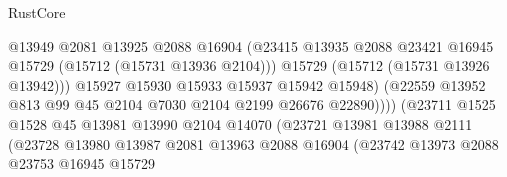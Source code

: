 \begin{lexlean}{RustCore}
\begin{coremodule}
                                          @13949
                                          @2081
                                          @13925
                                          @2088
                                          @16904
                                          (@23415
                                            @13935
                                            @2088
                                            @23421
                                            @16945
                                            @15729
                                            (@15712 (@15731 @13936 @2104)))
                                          @15729
                                          (@15712 (@15731 @13926 @13942)))
                                        @15927
                                        @15930
                                        @15933
                                        @15937
                                        @15942
                                        @15948)
                                      (@22559
                                        @13952
                                        @813
                                        @99
                                        @45
                                        @2104
                                        @7030
                                        @2104
                                        @2199
                                        @26676
                                        @22890))))
                                (@23711
                                  @1525
                                  @1528
                                  @45
                                  @13981
                                  @13990
                                  @2104
                                  @14070
                                  (@23721
                                    @13981
                                    @13988
                                    @2111
                                    (@23728
                                      @13980
                                      @13987
                                      @2081
                                      @13963
                                      @2088
                                      @16904
                                      (@23742
                                        @13973
                                        @2088
                                        @23753
                                        @16945
                                        @15729

\end{coremodule}
\end{lexlean}
